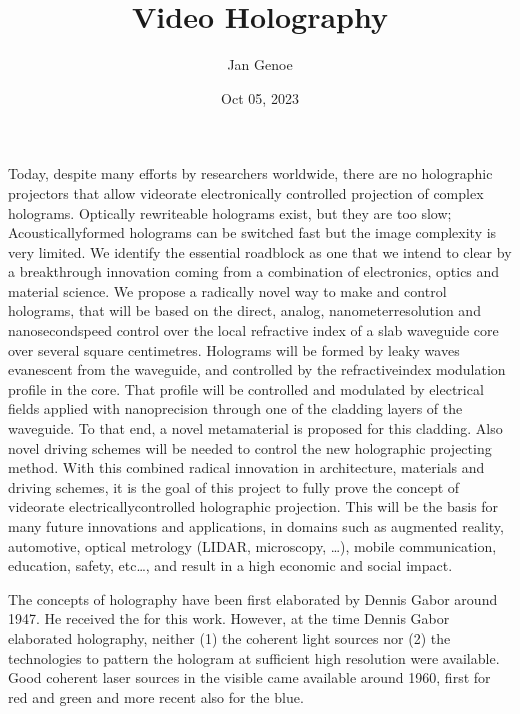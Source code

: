 \documentclass[a4paper,10pt,english,openany,oneside]{jupyterBook}
\title{Video Holography}
\date{Oct 05, 2023}
\author{Jan Genoe}
\begin{document}
\pagestyle{empty}
\sphinxmaketitle
\pagestyle{plain}
\sphinxtableofcontents
\pagestyle{normal}
\label{\detokenize{intro2::doc}}


\begin{DUlineblock}{0em}
\item[] 
\end{DUlineblock}

\sphinxAtStartPar
Today, despite many efforts by researchers world\sphinxhyphen{}wide, there are no holographic projectors that allow video\sphinxhyphen{}rate electronically controlled projection of complex holograms. Optically re\sphinxhyphen{}write\sphinxhyphen{}able holograms exist, but they are too slow; Acoustically\sphinxhyphen{}formed holograms can be switched fast but the image complexity is very limited. We identify the essential roadblock as one that we intend to clear by a breakthrough innovation coming from a combination of electronics, optics and material science.
We propose a radically novel way to make and control holograms, that will be based on the direct, analog, nanometer\sphinxhyphen{}resolution and nanosecond\sphinxhyphen{}speed control over the local refractive index of a slab waveguide core over several square centimetres. Holograms will be formed by leaky waves evanescent from the waveguide, and controlled by the refractive\sphinxhyphen{}index modulation profile in the core. That profile will be controlled and modulated by electrical fields applied with nano\sphinxhyphen{}precision through one of the cladding layers of the waveguide. To that end, a novel metamaterial is proposed for this cladding. Also novel driving schemes will be needed to control the new holographic projecting method.
With this combined radical innovation in architecture, materials and driving schemes, it is the goal of this project to fully prove the concept of video\sphinxhyphen{}rate electrically\sphinxhyphen{}controlled holographic projection. This will be the basis for many future innovations and applications, in domains such as augmented reality, automotive, optical metrology (LIDAR, microscopy, …), mobile communication, education, safety, etc…, and result in a high economic and social impact.

\begin{DUlineblock}{0em}
\item[] 
\end{DUlineblock}

\sphinxAtStartPar
The concepts of holography have been first elaborated by Dennis Gabor around 1947. He received the  for this work. However, at the time Dennis Gabor elaborated holography, neither (1) the coherent light sources nor (2) the technologies to pattern the hologram at sufficient high resolution were available. Good coherent laser sources in the visible came available around 1960, first for red and green and more recent also for the blue.
\end{document}
